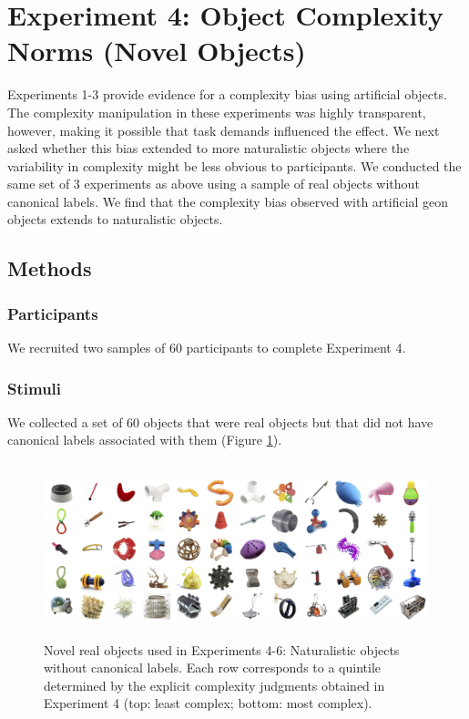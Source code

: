 \documentclass[man]{apa2}
\begin{document}
\section{Experiment 4: Object Complexity Norms (Novel Objects)}

Experiments 1-3 provide evidence for a complexity bias using artificial objects. The complexity manipulation in these experiments was highly transparent, however, making it possible that task demands influenced the effect. We next asked whether this bias extended to more naturalistic objects where the variability in complexity might be less obvious to participants. We conducted the same set of 3 experiments as above using a sample of real objects without canonical labels. We find that the complexity bias observed with artificial geon objects extends to naturalistic objects. 

\subsection{Methods}
\subsubsection{Participants} We recruited two samples of 60 participants to complete Experiment 4.

\subsubsection{Stimuli}
We collected a set of 60 objects that were real objects but that did not have canonical labels associated with them (Figure \ref{fig:realobjs}). 

\begin{figure} 
 \begin{center} 
  \includegraphics[height=2in]{figures/realobjs_stimuli.png} 
  \caption{\label{fig:realobjs} Novel real objects used in Experiments 4-6: Naturalistic objects without canonical labels. Each row corresponds to a quintile determined by the explicit complexity judgments obtained in Experiment 4 (top: least complex; bottom: most complex).} 
 \end{center} 
\end{figure}	
\end{document}
